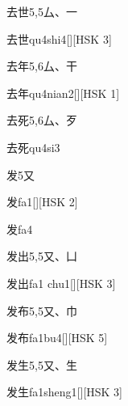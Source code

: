 \begin{entry}{去世}{5,5}{⼛、⼀}
  \begin{phonetics}{去世}{qu4shi4}[][HSK 3]
  \end{phonetics}
\end{entry}

\begin{entry}{去年}{5,6}{⼛、⼲}
  \begin{phonetics}{去年}{qu4nian2}[][HSK 1]
  \end{phonetics}
\end{entry}

\begin{entry}{去死}{5,6}{⼛、⽍}
  \begin{phonetics}{去死}{qu4si3}
  \end{phonetics}
\end{entry}

\begin{entry}{发}{5}{⼜}
  \begin{phonetics}{发}{fa1}[][HSK 2]
  \end{phonetics}
  \begin{phonetics}{发}{fa4}
  \end{phonetics}
\end{entry}

\begin{entry}{发出}{5,5}{⼜、⼐}
  \begin{phonetics}{发出}{fa1 chu1}[][HSK 3]
  \end{phonetics}
\end{entry}

\begin{entry}{发布}{5,5}{⼜、⼱}
  \begin{phonetics}{发布}{fa1bu4}[][HSK 5]
  \end{phonetics}
\end{entry}

\begin{entry}{发生}{5,5}{⼜、⽣}
  \begin{phonetics}{发生}{fa1sheng1}[][HSK 3]
  \end{phonetics}
\end{entry}

